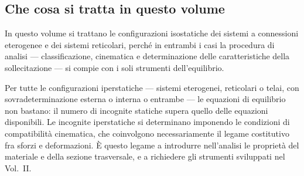 \subsection{Che cosa si tratta in questo volume}
\label{subsec:cat_volumi}

In questo volume si trattano le configurazioni isostatiche
dei sistemi a connessioni eterogenee e dei sistemi
reticolari, perché in entrambi i casi la procedura di
analisi --- classificazione, cinematica e determinazione
delle caratteristiche della sollecitazione --- si compie con
i soli strumenti dell'equilibrio.

Per tutte le configurazioni iperstatiche --- sistemi
eterogenei, reticolari o telai, con sovradeterminazione
esterna o interna o entrambe --- le equazioni di equilibrio
non bastano: il numero di incognite statiche supera quello
delle equazioni disponibili. Le incognite iperstatiche si
determinano imponendo le condizioni di compatibilità
cinematica, che coinvolgono necessariamente il legame
costitutivo fra sforzi e deformazioni. È questo legame a
introdurre nell'analisi le proprietà del materiale e della
sezione trasversale, e a richiedere gli strumenti sviluppati
nel Vol.~II.


